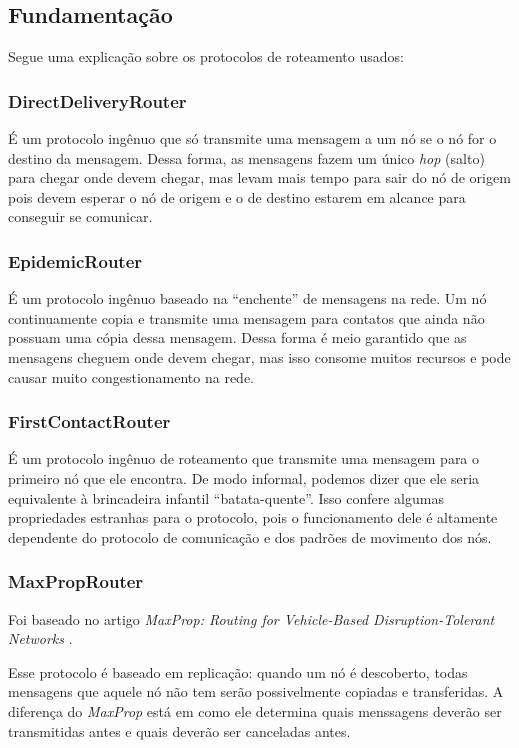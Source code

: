\documentclass[conference]{IEEEtran}
\begin{document}
\subsection{Fundamentação}
Segue uma explicação sobre os protocolos de roteamento usados:

\subsubsection{DirectDeliveryRouter}
É um protocolo ingênuo que só transmite uma mensagem a um nó se o nó for o destino da mensagem. Dessa forma, as mensagens fazem um único \textit{hop} (salto) para chegar onde devem chegar, mas levam mais tempo para sair do nó de origem pois devem esperar o nó de origem e o de destino estarem em alcance para conseguir se comunicar.

\subsubsection{EpidemicRouter}
É um protocolo ingênuo baseado na \textquotedblleft enchente\textquotedblright{} de mensagens na rede. Um nó continuamente copia e transmite uma mensagem para contatos que ainda não possuam uma cópia dessa mensagem.
Dessa forma é meio garantido que as mensagens cheguem onde devem chegar, mas isso consome muitos recursos e pode causar
muito congestionamento na rede.

\subsubsection{FirstContactRouter}
É um protocolo ingênuo de roteamento que transmite uma mensagem para o primeiro nó que ele encontra. De modo informal, podemos dizer que ele seria equivalente à brincadeira infantil \textquotedblleft batata-quente\textquotedblright{}. Isso confere algumas propriedades estranhas para o protocolo, pois o funcionamento dele é altamente dependente do protocolo de comunicação e dos padrões de movimento dos nós.

\subsubsection{MaxPropRouter}
Foi baseado no artigo \textit{MaxProp: Routing for Vehicle-Based Disruption-Tolerant Networks} \cite{MaxPropRouter:original}.
 
Esse protocolo é baseado em replicação: quando um nó é descoberto, todas mensagens que aquele nó não
tem serão possivelmente copiadas e transferidas. A diferença do \emph{MaxProp} está em como ele determina quais
menssagens deverão ser transmitidas antes e quais deverão ser canceladas antes.
\end{document}

